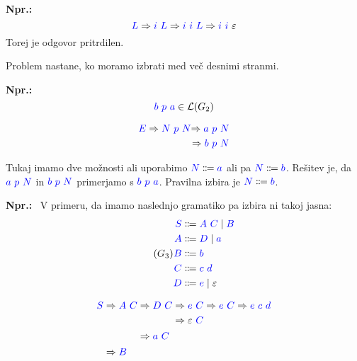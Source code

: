 \documentclass{article}
\newcommand{\Ex}{\textbf{Npr.:}\ }
\newcommand{\Symbol}[1]{\textcolor{blue}{#1}}
\newcommand{\Grammar}{G}
\newcommand{\Null}{\varepsilon}
\newcommand{\Language}[1]{\mathcal{L}(#1)}
\newcommand{\Arrow}{\Coloneqq}
\newcommand{\Derive}{\Rightarrow}
\newcommand{\Seq}{\ }
\newcommand{\Union}{\mathrel{|}}
\begin{document}
\Ex
  \begin{equation*}
    \Symbol{L} \Derive \Symbol{i} \Seq \Symbol{L} \Derive \Symbol{i} \Seq \Symbol{i} \Seq \Symbol{L} \Derive \Symbol{i} \Seq \Symbol{i} \Seq \Null
  \end{equation*}
  Torej je odgovor pritrdilen.

Problem nastane, ko moramo izbrati med več desnimi stranmi.

\Ex
  \begin{equation*}
    \Symbol{b} \Seq \Symbol{p} \Seq \Symbol{a} \in \Language{\Grammar_2}
  \end{equation*}

  \begin{equation*}
    \Symbol{E} \Derive \Symbol{N} \Seq \Symbol{p} \Seq \Symbol{N} \begin{aligned}[t]
      \Derive \Symbol{a} \Seq \Symbol{p} \Seq \Symbol{N}\\
      \Derive \Symbol{b} \Seq \Symbol{p} \Seq \Symbol{N}
    \end{aligned}
  \end{equation*}

Tukaj imamo dve možnosti ali uporabimo $\Symbol{N} \Arrow \Symbol{a}$ ali pa $\Symbol{N} \Arrow \Symbol{b}$.
Rešitev je, da $\Symbol{a} \Seq \Symbol{p} \Seq \Symbol{N}$ in $\Symbol{b} \Seq \Symbol{p} \Seq \Symbol{N}$ primerjamo s $\Symbol{b} \Seq \Symbol{p} \Seq \Symbol{a}$.
Pravilna izbira je $\Symbol{N} \Arrow \Symbol{b}$.

\Ex
V primeru, da imamo naslednjo gramatiko pa izbira ni takoj jasna:
\begin{equation*}
  \tag{$\Grammar_3$}
  \label{g:first}
  \begin{aligned}
    \Symbol{S} &\Arrow \Symbol{A} \Seq \Symbol{C} \Union \Symbol{B} \\
    \Symbol{A} &\Arrow \Symbol{D} \Union \Symbol{a} \\
    \Symbol{B} &\Arrow \Symbol{b}\\
    \Symbol{C} &\Arrow \Symbol{c} \Seq \Symbol{d}\\
    \Symbol{D} &\Arrow \Symbol{e} \Union \Null
  \end{aligned}
\end{equation*}

\begin{equation*}
  \Symbol{S} \begin{aligned}[t]
    &\Derive \Symbol{A} \Seq \Symbol{C} \begin{aligned}[t]
      &\Derive \Symbol{D} \Seq \Symbol{C} \begin{aligned}[t]
        &\Derive \Symbol{e} \Seq \Symbol{C} \Derive \Symbol{e} \Seq \Symbol{C} \Derive \Symbol{e} \Seq \Symbol{c} \Seq \Symbol{d}\\
        &\Derive \Null \Seq \Symbol{C}
      \end{aligned}\\
      &\Derive \Symbol{a} \Seq \Symbol{C}
    \end{aligned}\\
    &\Derive \Symbol{B}
  \end{aligned}
\end{equation*}
\end{document}
